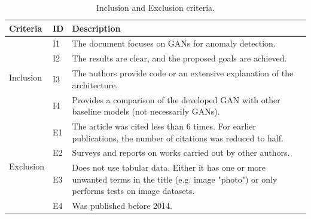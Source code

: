 \begin{table}[ht]
\caption{Inclusion and Exclusion criteria.}
\label{tab:criteria}
\begin{tabularx}{\textwidth}{@{}llX@{}}
\hline
\textbf{Criteria}                                       & \textbf{ID} & \textbf{Description}                                                                                                                                     \\ \midrule
\multirow{4}{*}{Inclusion}                     & I1 & The document focuses on GANs for anomaly detection.                                                                                             \\
                                               & I2 & The results are clear, and the proposed goals are achieved.                                                                                     \\
                                               & I3 & The authors provide code or an extensive explanation of the architecture.                                                                       \\
                                               & I4 & Provides a comparison of the developed GAN with other baseline models (not necessarily GANs).                                                   \\ \midrule
\multicolumn{1}{c}{\multirow{4}{*}{Exclusion}} & E1 & The article was cited less than 6 times. For earlier publications, the number of citations was reduced to half.                                 \\
\multicolumn{1}{c}{}                           & E2 & Surveys and reports on works carried out by other authors.                                                                                      \\
\multicolumn{1}{c}{}                           & E3 & Does not use tabular data. Either it has one or more unwanted terms in the title (e.g. image "photo") or only performs tests on image datasets. \\
\multicolumn{1}{c}{}                           & E4 & Was published before 2014. \\\hline                                                                                                                    
\end{tabularx}
\end{table}

